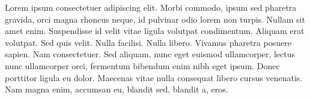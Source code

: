 




Lorem ipsum consectetuer adipiscing elit. Morbi commodo, ipsum sed pharetra gravida, orci magna rhoncus neque, id pulvinar odio lorem non turpis. Nullam sit amet enim. Suspendisse id velit vitae ligula volutpat condimentum. Aliquam erat volutpat. Sed quis velit. Nulla facilisi. Nulla libero. Vivamus pharetra posuere sapien. Nam consectetuer. Sed aliquam, nunc eget euismod ullamcorper, lectus nunc ullamcorper orci, fermentum bibendum enim nibh eget ipsum. Donec porttitor ligula eu dolor. Maecenas vitae nulla consequat libero cursus venenatis. Nam magna enim, accumsan eu, blandit sed, blandit a, eros.

